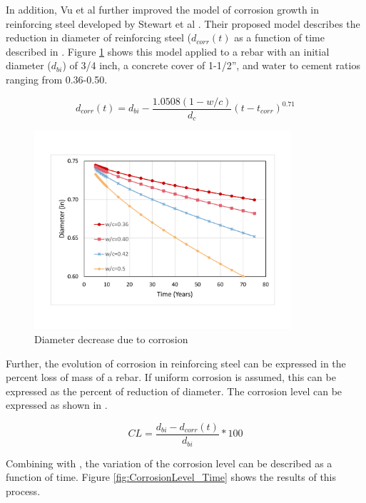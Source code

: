 In addition, Vu et al  further improved the model of corrosion growth in reinforcing steel developed by Stewart et al \cite{Vu2000}\cite{Stewart1998}\cite{Choe2008}\cite{Ghosh2010}. Their proposed model describes the reduction in diameter of reinforcing steel ($d_{corr}(t)$ as a function of time described in . Figure \ref{fig:DiameterEvolution} shows this model applied to a rebar with an initial diameter ($d_{bi}$) of 3/4 inch, a concrete cover of 1-1/2”, and water to cement ratios ranging from 0.36-0.50.

\begin{equation}
  d_{corr}(t)=d_{bi}-\frac{1.0508(1-w/c)}{d_c} (t-t_{corr})^{0.71}
  \label{eq.CorrosionEvolution}
\end{equation} 

\begin{figure}[htbp]
\centering
\includegraphics[width=0.85\textwidth]{Chapter-2/figs/DiameterDecrease}
\caption{Diameter decrease due to corrosion}
\label{fig:DiameterEvolution}
\end{figure}

Further, the evolution of corrosion in reinforcing steel can be expressed in the percent loss of mass of a rebar. If uniform corrosion is assumed, this can be expressed as the percent of reduction of diameter. The corrosion level can be expressed as shown in .

\begin{equation}
	CL=\frac{d_{bi}-d_{corr}(t)}{d_{bi}}*100%
  \label{eq.CorrosionLevel}
\end{equation} 

Combining  with ,  the variation of the corrosion level can be described as a function of time. Figure  \ref{fig:CorrosionLevel_Time} shows the results of this process.


